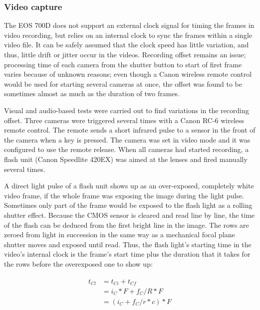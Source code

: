 \subsubsection{Video capture}


The EOS 700D does not support an external clock signal for timing the frames in video recording, but relies on an internal clock to sync the frames within a single video file.
It can be safely assumed that the clock speed has little variation, and thus, little drift or jitter occur in the videos.
Recording offset remains an issue;
processing time of each camera from the shutter button to start of first frame varies because of unknown reasons; even though a Canon wireless remote control would be used for starting several cameras at once, the offset was found to be sometimes almost as much as the duration of two frames.


Visual and audio-based tests were carried out to find variations in the recording offset.
Three cameras were triggered several times with a Canon RC-6 wireless remote control.
The remote sends a short infrared pulse to a sensor in the front of the camera when a key is pressed.
The camera was set in video mode and it was configured to use the remote release.
When all cameras had started recording, a flash unit (Canon Speedlite 420EX) was aimed at the lenses and fired manually several times.


A direct light pulse of a flash unit shows up as an over-exposed, completely white video frame, if the whole frame was exposing the image during the light pulse.
Sometimes only part of the frame would be exposed to the flash light as a rolling shutter effect.
Because the CMOS sensor is cleared and read line by line, the time of the flash can be deduced from the first bright line in the image.
The rows are zeroed from light in succession in the same way as a mechanical focal plane shutter moves and exposed until read.
Thus, the flash light's starting time in the video's internal clock is the frame's start time plus the duration that it takes for the rows before the overexposed one to show up:

\begin{align} \begin{split} \label{eq:timingcalib}
t_{Cl} &= t_{Ci} + t_{Cf} \\
&= i_C * F + f_C / R * F \\
&= (i_C + f_C / r * c) * F
\end{split} \end{align}

